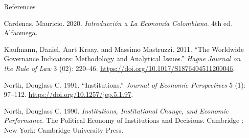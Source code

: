 \documentclass[
  ignorenonframetext,
]{beamer}
\newlength{\cslhangindent}
\newenvironment{CSLReferences}[2] %
 {\begin{list}{}{%
  \setlength{\itemindent}{0pt}
  \setlength{\leftmargin}{0pt}
  \setlength{\parsep}{0pt}
  \ifodd #1
   \setlength{\leftmargin}{\cslhangindent}
   \setlength{\itemindent}{-1\cslhangindent}
  \fi
  \setlength{\itemsep}{#2\baselineskip}}}
 {\end{list}}
\begin{document}
\begin{frame}[allowframebreaks]{References}
\label{refs}
\begin{CSLReferences}{1}{0}
Cardenas, Mauricio. 2020. \emph{Introducción a La {Economía}
{Colombiana}}. 4th ed. Alfaomega.

Kaufmann, Daniel, Aart Kraay, and Massimo Mastruzzi. 2011. {``The
{Worldwide} {Governance} {Indicators}: {Methodology} and {Analytical}
{Issues}.''} \emph{Hague Journal on the Rule of Law} 3 (02): 220--46.
\url{https://doi.org/10.1017/S1876404511200046}.

North, Douglass C. 1991. {``Institutions.''} \emph{Journal of Economic
Perspectives} 5 (1): 97--112. \url{https://doi.org/10.1257/jep.5.1.97}.

North, Douglass C. 1990. \emph{Institutions, Institutional Change, and
Economic Performance}. The {Political} Economy of Institutions and
Decisions. Cambridge ; New York: Cambridge University Press.

\end{CSLReferences}
\end{frame}
\end{document}

